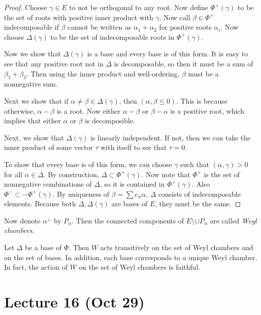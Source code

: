 \documentclass[twoside, 10pt]{article}
\begin{document}
    \begin{proof}
        Choose $\gamma \in E$ to not be orthogonal to any root. Now define $\Phi^+(\gamma)$ to be the set of roots with positive inner product with $\gamma$. Now call $\beta \in \Phi^+$ indecomposable if $\beta$ cannot be written as $\alpha_1 + \alpha_2$ for positive roots $\alpha_i$. Now choose $\Delta(\gamma)$ to be the set of indecomposable roots in $\Phi^+(\gamma)$.

        Now we show that $\Delta(\gamma)$ is a base and every base is of this form. It is easy to see that any positive root not in $\Delta$ is decomposable, so then it must be a sum of $\beta_1 + \beta_2$. Then using the inner product and well-ordering, $\beta$ must be a nonnegative sum.

        Next we show that if $\alpha \neq \beta \in \Delta(\gamma)$, then $(\alpha,\beta \leq 0)$. This is because otherwise, $\alpha - \beta$ is a root. Now either $\alpha-\beta$ or $\beta-\alpha$ is a positive root, which implies that either $\alpha$ or $\beta$ is decomposible.

        Next, we show that $\Delta(\gamma)$ is linearly independent. If not, then we can take the inner product of some vector $\tau$ with itself to see that $\tau = 0$.

        To show that every base is of this form, we can choose $\gamma$ such that $(\alpha,\gamma) > 0$ for all $\alpha \in \Delta$. By construction, $\Delta \subset \Phi^+(\gamma)$. Now note that $\Phi^+$ is the set of nonnegative combinations of $\Delta$, so it is contained in $\Phi^+(\gamma)$. Also $\Phi^- \subset -\Phi^+(\gamma)$. By uniqueness of $\beta = \sum c_{\alpha}\alpha$, $\Delta$ consists of indecomposable elements. Because both $\Delta, \Delta(\gamma)$ are bases of $E$, they must be the same.
    \end{proof}

    Now denote $\alpha^{\perp}$ by $P_{\alpha}$. Then the connected components of $E \setminus \cup P_{\alpha}$ are called \textit{Weyl chambers}.

    \begin{thm}
        Let $\Delta$ be a base of $\Phi$. Then $W$ acts transitively on the set of Weyl chambers and on the set of bases. In addition, each base corresponds to a unique Weyl chamber. In fact, the action of $W$ on the set of Weyl chambers is faithful.
    \end{thm}

    \section{Lecture 16 (Oct 29)}%
    \label{sec:lecture_16_oct_29_}
    
\end{document}
